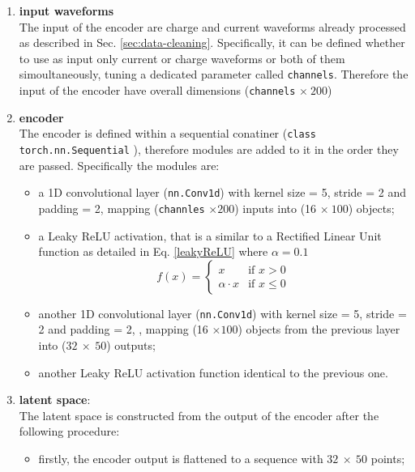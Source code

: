 \begin{enumerate}
    \item \textbf{input waveforms}\\
    The input of the encoder are charge and current waveforms already processed as described in Sec. \ref{sec:data-cleaning}. Specifically, it can be defined whether to use as input only current or charge waveforms or both of them simoultaneously, tuning a dedicated parameter called \texttt{channels}. Therefore the input of the encoder have overall dimensions (\texttt{channels} $\times~200$)
    \item \textbf{encoder}\\
    The encoder is defined within a sequential conatiner (\texttt{class torch.nn.Sequential} \cite{torchSequential}), therefore modules are added to it in the order they are passed. Specifically the modules are:
    \begin{itemize}
        \item a 1D convolutional layer (\texttt{nn.Conv1d}) with kernel size = 5, stride = 2 and padding = 2, mapping (\texttt{channles} $\times 200$) inputs into (16 $\times~100$) objects;
        \item a Leaky ReLU activation, that is a similar to a Rectified Linear Unit function as detailed in Eq. \ref{leakyReLU} where $\alpha = 0.1$
        \begin{equation}
            \label{leakyReLU}
            f(x) = 
            \begin{cases} 
                x & \text{if } x > 0 \\
                \alpha \cdot x & \text{if } x \le 0 
            \end{cases}
        \end{equation}
        \item another 1D convolutional layer (\texttt{nn.Conv1d}) with kernel size = 5, stride = 2 and padding = 2, , mapping (16 $\times 100$) objects from the previous layer into ($32~\times~50$) outputs;
        \item another Leaky ReLU activation function identical to the previous one.
    \end{itemize} 
    \item \textbf{latent space}:\\
    The latent space is constructed from the output of the encoder after the following procedure:
    \begin{itemize}
        \item firstly, the encoder output is flattened to a sequence with $32~\times~50$ points;

\end{itemize}
\end{enumerate}

